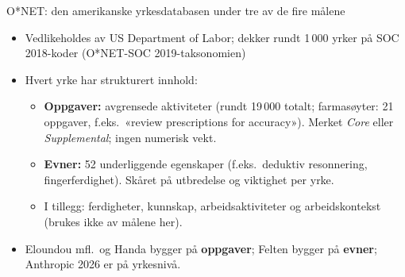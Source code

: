 
\begin{frame}{O*NET: den amerikanske yrkesdatabasen under tre av de fire målene}
\begin{itemize}\setlength{\itemsep}{6pt}
  \item Vedlikeholdes av US Department of Labor; dekker rundt 1\,000 yrker på SOC 2018-koder (O*NET-SOC 2019-taksonomien)
  \item Hvert yrke har strukturert innhold:
  \begin{itemize}
    \item \textbf{Oppgaver:} avgrensede aktiviteter (rundt 19\,000 totalt; farmasøyter: 21 oppgaver, f.eks.\ «review prescriptions for accuracy»). Merket \emph{Core} eller \emph{Supplemental}; ingen numerisk vekt.
    \item \textbf{Evner:} 52 underliggende egenskaper (f.eks.\ deduktiv resonnering, fingerferdighet). Skåret på utbredelse og viktighet per yrke.
    \item I tillegg: ferdigheter, kunnskap, arbeidsaktiviteter og arbeidskontekst (brukes ikke av målene her).
  \end{itemize}
  \item Eloundou mfl.\ og Handa bygger på \textbf{oppgaver}; Felten bygger på \textbf{evner}; Anthropic 2026 er på yrkesnivå.
\end{itemize}
\end{frame}

